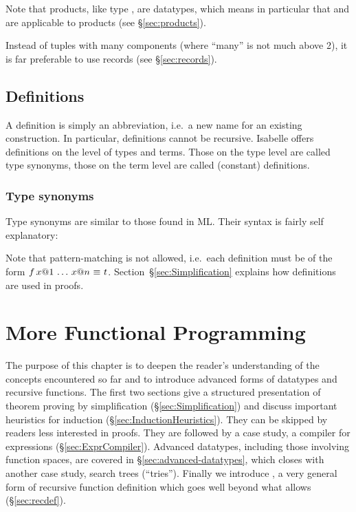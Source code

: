 Note that products, like type , are datatypes, which means
in particular that  and  are applicable to
products (see \S\ref{sec:products}).

Instead of tuples with many components (where ``many'' is not much above 2),
it is far preferable to use records (see \S\ref{sec:records}).

\section{Definitions}
\label{sec:Definitions}

A definition is simply an abbreviation, i.e.\ a new name for an existing
construction. In particular, definitions cannot be recursive. Isabelle offers
definitions on the level of types and terms. Those on the type level are
called type synonyms, those on the term level are called (constant)
definitions.


\subsection{Type synonyms}

Type synonyms are similar to those found in ML. Their syntax is fairly self
explanatory:

%

Note that pattern-matching is not allowed, i.e.\ each definition must be of
the form $f\,x@1\,\dots\,x@n~\emph{$\equiv$}~t$.
Section~\S\ref{sec:Simplification} explains how definitions are used
in proofs.




\chapter{More Functional Programming}

The purpose of this chapter is to deepen the reader's understanding of the
concepts encountered so far and to introduce advanced forms of datatypes and
recursive functions. The first two sections give a structured presentation of
theorem proving by simplification (\S\ref{sec:Simplification}) and discuss
important heuristics for induction (\S\ref{sec:InductionHeuristics}). They can
be skipped by readers less interested in proofs. They are followed by a case
study, a compiler for expressions (\S\ref{sec:ExprCompiler}). Advanced
datatypes, including those involving function spaces, are covered in
\S\ref{sec:advanced-datatypes}, which closes with another case study, search
trees (``tries'').  Finally we introduce , a very general
form of recursive function definition which goes well beyond what
 allows (\S\ref{sec:recdef}).


